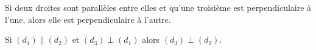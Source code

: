 Si deux droites sont parallèles entre elles et qu'une troisième est perpendiculaire à l'une,
alors elle est perpendiculaire à l'autre.%
\begin{center}
    Si $(d_1)\parallel(d_2)$ et $(d_3)\perp(d_1)$ alors $(d_3)\perp(d_2)$.
\end{center}